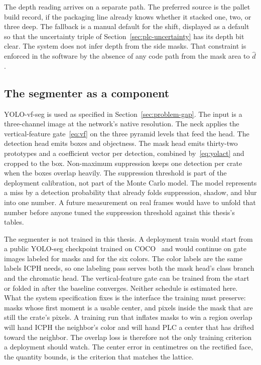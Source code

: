 The depth reading arrives on a separate path. The preferred source is the pallet build record, if the packaging line already knows whether it stacked one, two, or three deep. The fallback is a manual default for the shift, displayed as a default so that the uncertainty triple of Section~\ref{sec:plc-uncertainty} has its depth bit clear. The system does not infer depth from the side masks. That constraint is enforced in the software by the absence of any code path from the mask area to $\hat{d}$.

\subsection{The segmenter as a component}
\label{sec:segmenter-component}

YOLO-vf-seg is used as specified in Section~\ref{sec:problem-gap}. The input is a three-channel image at the network's native resolution. The neck applies the vertical-feature gate~\eqref{eq:vf} on the three pyramid levels that feed the head. The detection head emits boxes and objectness. The mask head emits thirty-two prototypes and a coefficient vector per detection, combined by~\eqref{eq:yolact} and cropped to the box. Non-maximum suppression keeps one detection per crate when the boxes overlap heavily. The suppression threshold is part of the deployment calibration, not part of the Monte Carlo model. The model represents a miss by a detection probability that already folds suppression, shadow, and blur into one number. A future measurement on real frames would have to unfold that number before anyone tuned the suppression threshold against this thesis's tables.

The segmenter is not trained in this thesis. A deployment train would start from a public YOLO-seg checkpoint trained on COCO~\cite{lin2014coco,jocher2023yolov8} and would continue on gate images labeled for masks and for the six colors. The color labels are the same labels ICPH needs, so one labeling pass serves both the mask head's class branch and the chromatic head. The vertical-feature gate can be trained from the start or folded in after the baseline converges. Neither schedule is estimated here. What the system specification fixes is the interface the training must preserve: masks whose first moment is a usable center, and pixels inside the mask that are still the crate's pixels. A training run that inflates masks to win a region overlap will hand ICPH the neighbor's color and will hand PLC a center that has drifted toward the neighbor. The overlap loss is therefore not the only training criterion a deployment should watch. The center error in centimetres on the rectified face, the quantity  bounds, is the criterion that matches the lattice.

